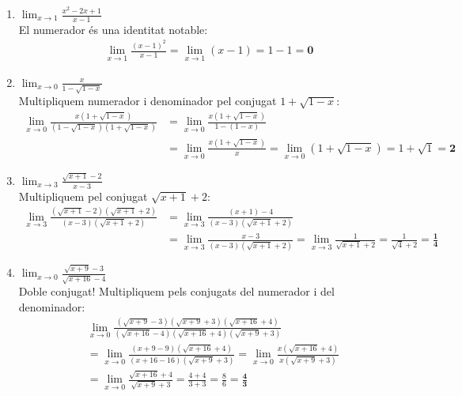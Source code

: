 \documentclass[12pt,a4paper]{article}
\begin{document}
\begin{enumerate}[label=\textbf{3.\arabic*.}, leftmargin=*, itemsep=0.8cm]
    \item $\displaystyle \lim_{x \to 1} \frac{x^2-2x+1}{x-1}$ \\
    El numerador és una identitat notable:
    \begin{align*}
        \lim_{x \to 1} \frac{(x-1)^2}{x-1} = \lim_{x \to 1} (x-1) = 1 - 1 = \mathbf{0}
    \end{align*}

    \item $\displaystyle \lim_{x \to 0} \frac{x}{1-\sqrt{1-x}}$ \\
    Multipliquem numerador i denominador pel conjugat $1+\sqrt{1-x}$:
    \begin{align*}
        \lim_{x \to 0} \frac{x(1+\sqrt{1-x})}{(1-\sqrt{1-x})(1+\sqrt{1-x})} &= \lim_{x \to 0} \frac{x(1+\sqrt{1-x})}{1 - (1-x)} \\
        &= \lim_{x \to 0} \frac{x(1+\sqrt{1-x})}{x} = \lim_{x \to 0} (1+\sqrt{1-x}) = 1+\sqrt{1} = \mathbf{2}
    \end{align*}

    \item $\displaystyle \lim_{x \to 3} \frac{\sqrt{x+1}-2}{x-3}$ \\
    Multipliquem pel conjugat $\sqrt{x+1}+2$:
    \begin{align*}
        \lim_{x \to 3} \frac{(\sqrt{x+1}-2)(\sqrt{x+1}+2)}{(x-3)(\sqrt{x+1}+2)} &= \lim_{x \to 3} \frac{(x+1)-4}{(x-3)(\sqrt{x+1}+2)} \\
        &= \lim_{x \to 3} \frac{x-3}{(x-3)(\sqrt{x+1}+2)} = \lim_{x \to 3} \frac{1}{\sqrt{x+1}+2} = \frac{1}{\sqrt{4}+2} = \mathbf{\frac{1}{4}}
    \end{align*}

    \item $\displaystyle \lim_{x \to 0} \frac{\sqrt{x+9}-3}{\sqrt{x+16}-4}$ \\
    Doble conjugat! Multipliquem pels conjugats del numerador i del denominador:
    \begin{align*}
        &\lim_{x \to 0} \frac{(\sqrt{x+9}-3)(\sqrt{x+9}+3)(\sqrt{x+16}+4)}{(\sqrt{x+16}-4)(\sqrt{x+16}+4)(\sqrt{x+9}+3)} \\
        &= \lim_{x \to 0} \frac{(x+9-9)(\sqrt{x+16}+4)}{(x+16-16)(\sqrt{x+9}+3)} = \lim_{x \to 0} \frac{x(\sqrt{x+16}+4)}{x(\sqrt{x+9}+3)} \\
        &= \lim_{x \to 0} \frac{\sqrt{x+16}+4}{\sqrt{x+9}+3} = \frac{4+4}{3+3} = \frac{8}{6} = \mathbf{\frac{4}{3}}
    \end{align*}


\end{enumerate}
\end{document}
